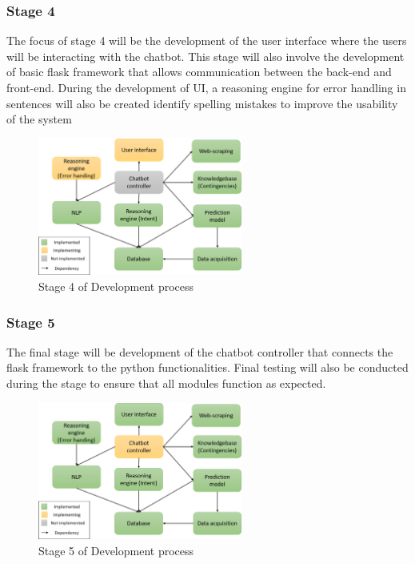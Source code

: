 \documentclass[11pt]{article}
\begin{document}
\subsubsection{Stage 4}
The focus of stage 4 will be the development of the user interface where the users will be interacting with the chatbot. This stage will also involve the development of basic flask framework that allows communication between the back-end and front-end. During the development of UI, a reasoning engine for error handling in sentences will also be created identify spelling mistakes to improve the usability of the system
\begin{figure}[!htb]
	\centering
	\includegraphics[width=0.6\textwidth]{Stage_4}
	\caption{Stage 4 of Development process }\label{fig:Stage 4}
\end{figure}

\subsubsection{Stage 5}
The final stage will be development of the chatbot controller that connects the flask framework to the python functionalities. Final testing will also be conducted during the stage to ensure that all modules function as expected. 
\begin{figure}[!htb]
	\centering
	\includegraphics[width=0.6\textwidth]{Stage_5}
	\caption{Stage 5 of Development process }\label{fig:Stage 5}
\end{figure}
\end{document}

